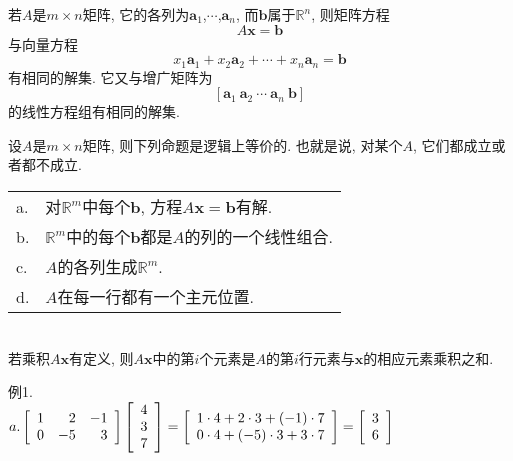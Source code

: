 \begin{TheoremOne}
若$A$是$m\times n$矩阵, 它的各列为$\bm{a}_1$,$\cdots$,$\bm{a}_n$, 而$\bm{b}$属于$\mathbb{R}^n$, 则矩阵方程
\[A\bm{x}=\bm{b}\]
与向量方程
\[x_1\bm{a}_1+x_2\bm{a}_2+\cdots+x_n\bm{a}_n=\bm{b}\]
有相同的解集. 它又与增广矩阵为
\[[\bm{a}_1\ \bm{a}_2\ \cdots\ \bm{a}_n\ \bm{b}]\]
的线性方程组有相同的解集.\\[2ex]
\end{TheoremOne}

\begin{center}
\end{center}\vspace{4ex}

\begin{TheoremOne}
设$A$是$m\times n$矩阵, 则下列命题是逻辑上等价的. 也就是说, 对某个$A$, 它们都成立或者都不成立.\\
\begin{tabular}{l@{\,}l}
a. & 对$\mathbb{R}^m$中每个$\bm{b}$, 方程$A\bm{x}=\bm{b}$有解.\\
b. & $\mathbb{R}^m$中的每个$\bm{b}$都是$A$的列的一个线性组合.\\
c. & $A$的各列生成$\mathbb{R}^m$.\\
d. & $A$在每一行都有一个主元位置.\\[2ex]
\end{tabular}
\end{TheoremOne}\vspace{2ex}

\begin{law}[计算$A\bm{x}$的行---向量规则]\ \\
若乘积$A\bm{x}$有定义, 则$A\bm{x}$中的第$i$个元素是$A$的第$i$行元素与$\bm{x}$的相应元素乘积之和.
\end{law}\vspace{2ex}

例1.\\
$\displaystyle a.\left[\begin{array}{r r r}
	1 & 2 & -1\\
	0 & -5 & 3
    \end{array}\right]
    \left[\begin{array}{r}
        4\\
	3\\
	7
    \end{array}\right]=
    \left[\begin{array}{r}
        1\cdot4+2\cdot3+(-1)\cdot7\\
	0\cdot4+(-5)\cdot3+3\cdot7
    \end{array}\right]=
    \left[\begin{array}{r}
        3\\
	6
    \end{array}\right]$\\[2ex]

